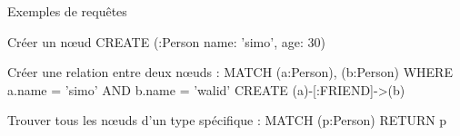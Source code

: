 \begin{frame}{Exemples de requêtes}
  \begin{block}{Créer un nœud}
  CREATE (:Person {name: 'simo', age: 30})

\end{block}
    \begin{block}{Créer une relation entre deux nœuds :}
   MATCH (a:Person), (b:Person)
WHERE a.name = 'simo' AND b.name = 'walid'
CREATE (a)-[:FRIEND]->(b)

  \end{block}
   \begin{block}{Trouver tous les nœuds d'un type spécifique :}
   MATCH (p:Person)
RETURN p

  \end{block}
  \end{frame}